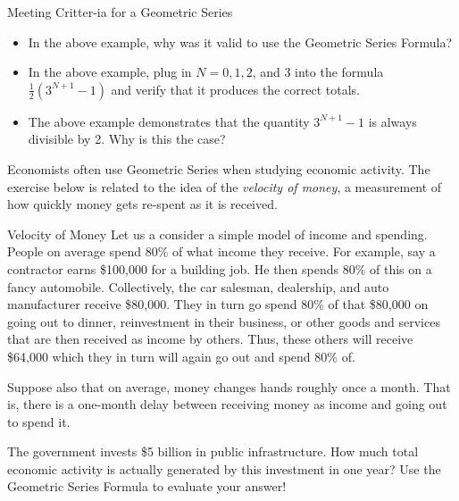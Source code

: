 \begin{exercise}{Meeting Critter-ia for a Geometric Series \Coffeecup}
\begin{itemize}
\item In the above example, why was it valid to use the Geometric Series Formula? 
\vspace*{.3in}
\item In the above example, plug in $N=0,1,2$, and 3 into the formula $\frac{1}{2}\left(3^{N+1}-1\right)$ and verify that it produces the correct totals.
\vspace*{.5in}
\item The above example demonstrates that the quantity $3^{N+1}-1$ is always divisible by 2.  Why is this the case?
\vspace*{.5in}
\end{itemize}
\end{exercise}

Economists often use Geometric Series when studying economic activity.  The exercise below is related to the idea of the \emph{velocity of money}, a measurement of how quickly money gets re-spent as it is received.  

\begin{exercise}{Velocity of Money \Coffeecup \Coffeecup } Let us a consider a simple model of income and spending.  People on average spend 80\% of what income they receive.  For example, say a contractor earns \$100,000 for a building job.  He then spends 80\% of this on a fancy automobile. Collectively, the car salesman, dealership, and auto manufacturer receive \$80,000.  They in turn go spend 80\% of that \$80,000 on going out to dinner, reinvestment in their business, or other goods and services that are then received as income by others.  Thus, these others will receive \$64,000 which they in turn will again go out and spend 80\% of.  


Suppose also that on average, money changes hands roughly once a month.  That is, there is a one-month delay between receiving money as income and going out to spend it. 


The government invests \$5 billion in public infrastructure.  How much total economic activity is actually generated by this investment in one year? Use the Geometric Series Formula to evaluate your answer!

\vspace*{1in}
\end{exercise}

